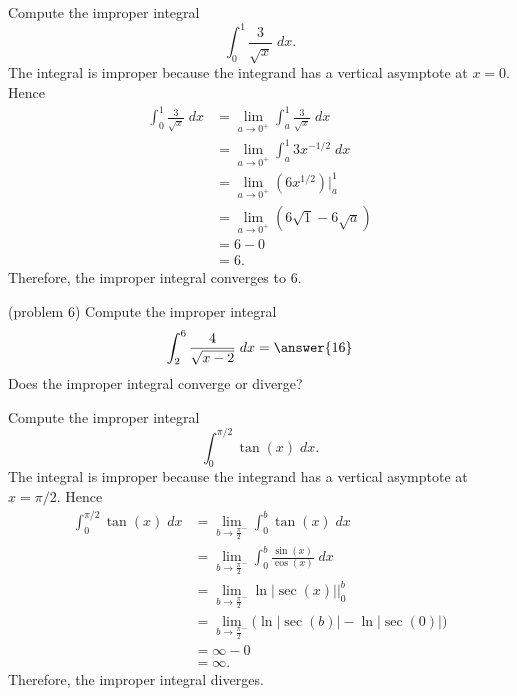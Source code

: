 \documentclass[handout]{ximera}
\begin{document}
\begin{example}[example 6]
Compute the improper integral
\[
\int_0^1 \frac{3}{\sqrt x} \; dx.
\]
The integral is improper because the integrand has a vertical asymptote at $x = 0$. Hence
\begin{align*}
\int_0^1 \frac{3}{\sqrt x} \; dx &= \lim_{a \to 0^+} \int_a^1 \frac{3}{\sqrt x} \; dx\\
                                 &= \lim_{a \to 0^+} \int_a^1 3x^{-1/2} \; dx\\
                                 &= \lim_{a \to 0^+} \left( 6x^{1/2}  \right) \bigg|_a^1\\
                                 &= \lim_{a \to 0^+} \left( 6\sqrt{1} - 6\sqrt{a}  \right) \\
                                 &=  6 - 0   \\
                                 &= 6.
\end{align*}
 Therefore, the improper integral converges to 6.
 \end{example}
 
\begin{problem}(problem 6)
Compute the improper integral
\[
\int_2^6 \frac{4}{\sqrt{x-2}} \; dx = \answer{16}
\]
Does the improper integral converge or diverge?
\begin{multipleChoice}
\end{multipleChoice}
\end{problem}


\begin{example}[example 7]
Compute the improper integral
\[
\int_0^{\pi/2} \tan(x) \; dx.
\]
The integral is improper because the integrand has a vertical asymptote at $x = \pi/2$. Hence
\begin{align*}
\int_0^{\pi/2} \tan(x) \; dx &= \lim_{b \to \frac{\pi}{2}^-} \int_0^b \tan(x) \; dx\\
                                 &= \lim_{b \to \frac{\pi}{2}^-} \int_0^b \frac{\sin(x)}{\cos(x)} \; dx\\
                                 &= \lim_{b \to \frac{\pi}{2}^-}  \ln|\sec(x)|   \bigg|_0^b\\
                                 &= \lim_{b \to \frac{\pi}{2}^-} \big( \ln|\sec(b)| - \ln|\sec(0)|  \big) \\
                                 &=  \infty - 0  \\
                                 &= \infty.
\end{align*}
 Therefore, the improper integral diverges.
 \end{example}
 
\end{document}
